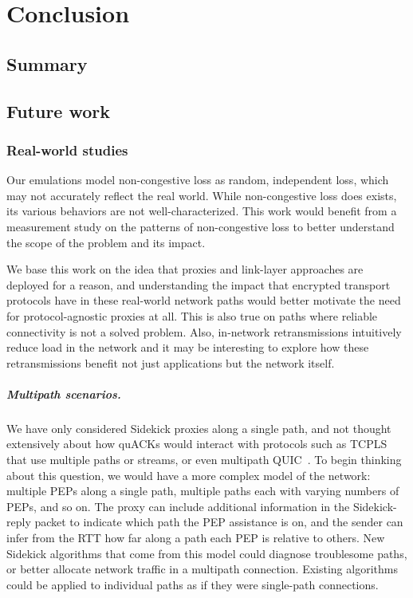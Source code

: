 \chapter{Conclusion}
\section{Summary}
\section{Future work}

\subsection{Real-world studies}

Our emulations model non-congestive loss as random, independent loss,
which may not accurately reflect the real world. While non-congestive loss
does exists, its various behaviors are not well-characterized. This work
would benefit from a measurement study on the patterns of non-congestive loss
to better understand the scope of the problem and its impact.

We base this work on the idea that proxies and link-layer approaches are
deployed for a reason, and understanding the impact that encrypted transport
protocols have in these real-world network paths would better motivate the need
for protocol-agnostic proxies at all. This is also true on paths where
reliable connectivity is not a solved problem. Also,
in-network retransmissions intuitively reduce load in the network and it may be
interesting to explore how these retransmissions benefit not just
applications but the network itself.

\paragraph{Multipath scenarios.}
We have only considered Sidekick proxies along a single path, and not thought
extensively about how quACKs would interact with protocols such as
\mbox{TCPLS}~\cite{rochet2020tcpls} that use multiple paths or streams,
or even multipath QUIC~\cite{de2017multipath}.
To begin thinking about this question, we would have a more complex model of
the network: multiple PEPs along a single path, multiple paths each with varying
numbers of PEPs, and so on. The proxy can include
additional information in the Sidekick-reply packet to indicate which path the
PEP assistance is on, and the sender can infer from the RTT how far along a path each PEP
is relative to others. New Sidekick algorithms that come from this model could
diagnose troublesome paths, or better allocate network traffic in a multipath
connection. Existing algorithms could be applied to individual paths as if they
were single-path connections.

